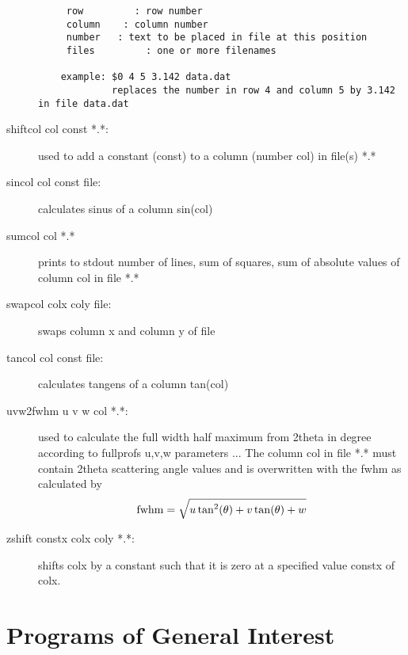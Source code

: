 \begin{description}
\begin{verbatim}
     row         : row number
     column    : column number
     number   : text to be placed in file at this position
     files         : one or more filenames

    example: $0 4 5 3.142 data.dat
             replaces the number in row 4 and column 5 by 3.142 in file data.dat
\end{verbatim}
\item [\prg shiftcol\index{shiftcol} col const *.*:] used to add a constant (const) to a column %
(number col) in file(s) *.*
\item [\prg sincol\index{sincol} col const file:] calculates sinus of a column sin(col) 
\item [\prg sumcol\index{sumcol} col *.*] prints to stdout number of lines, sum of squares, sum %
of absolute values of column col in file *.*
\item [\prg swapcol\index{swapcol} colx coly file:] swaps column x and column y of file
\item [\prg tancol\index{tanncol} col const file:] calculates tangens of a column tan(col) 
\item [\prg uvw2fwhm\index{uvw2fwhm} u v w col *.*:] used to calculate the full
                   width half maximum from
                   2theta in degree according to fullprofs u,v,w parameters ...
                  The column col in file *.* must contain 2theta scattering angle
                 values and is overwritten with the fwhm as calculated by
                  \begin{equation}
                     {\rm  fwhm }= \sqrt {u \tan^2(\theta) + v \tan(\theta) + w}
                \end{equation}
\item [\prg zshift\index{zshift} constx colx coly *.*:] shifts colx by a constant such that it %
is zero at a specified value constx of colx. 
\end{description}

\section{Programs of General Interest}

